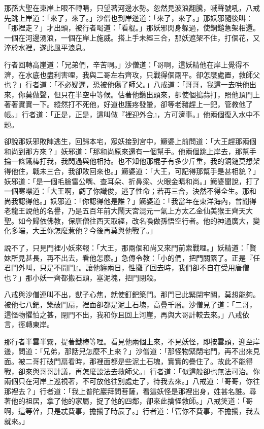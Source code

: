 那孫大聖在東岸上眼不轉睛，只望著河邊水勢。忽然見波浪翻騰，喊聲號吼，八戒先跳上岸道：「來了，來了。」沙僧也到岸邊道：「來了，來了。」那妖邪隨後叫：「那裡走？」才出頭，被行者喝道：「看棍。」那妖邪閃身躲過，使銅鎚急架相還。一個在河邊湧浪，一個在岸上施威。搭上手未經三合，那妖遮架不住，打個花，又淬於水裡，遂此風平浪息。

行者回轉高崖道：「兄弟們，辛苦啊。」沙僧道：「哥啊，這妖精他在岸上覺得不濟，在水底也盡利害哩，我與二哥左右齊攻，只戰得個兩平。卻怎麼處置，救師父也？」行者道：「不必疑遲，恐被他傷了師父。」八戒道：「哥哥，我這一去哄他出來，你莫做聲，但只在半空中等候。估著他鑽出頭來，卻使個搗蒜打，照他頂門上著著實實一下。縱然打不死他，好道也護疼發暈，卻等老豬趕上一鈀，管教他了帳。」行者道：「正是，正是，這叫做『裡迎外合』，方可濟事。」他兩個復入水中不題。

卻說那妖邪敗陣逃生，回歸本宅，眾妖接到宮中，鱖婆上前問道：「大王趕那兩個和尚到那方來？」妖邪道：「那和尚原來還有一個幫手。他兩個跳上岸去，那幫手掄一條鐵棒打我，我閃過與他相持。也不知他那棍子有多少斤重，我的銅鎚莫想架得他住，戰未三合，我卻敗回來也。」鱖婆道：「大王，可記得那幫手是甚相貌？」妖邪道：「是一個毛臉雷公嘴、查耳朵、折鼻梁、火眼金睛和尚。」鱖婆聞說，打了一個寒噤道：「大王啊，虧了你識俊，逃了性命；若再三合，決然不得全生。那和尚我認得他。」妖邪道：「你認得他是誰？」鱖婆道：「我當年在東洋海內，曾聞得老龍王說他的名譽，乃是五百年前大鬧天宮混元一氣上方太乙金仙美猴王齊天大聖。如今歸依佛教，保唐僧往西天取經，改名喚做孫悟空行者。他的神通廣大，變化多端，大王你怎麼惹他？今後再莫與他戰了。」

說不了，只見門裡小妖來報：「大王，那兩個和尚又來門前索戰哩。」妖精道：「賢妹所見甚長，再不出去，看他怎麼。」急傳令教：「小的們，把門關緊了。正是『任君門外叫，只是不開門』。讓他纏兩日，性攤了回去時，我們卻不自在受用唐僧也？」那小妖一齊都搬石頭，塞泥塊，把門閉殺。

八戒與沙僧連叫不出，獃子心焦，就使釘鈀築門。那門已此緊閉牢關，莫想能夠。被他七八鈀，築破門扇，裡面卻都是泥土石塊，高疊千層。沙僧見了道：「二哥，這怪物懼怕之甚，閉門不出，我和你且回上河崖，再與大哥計較去來。」八戒依言，徑轉東岸。

那行者半雲半霧，提著鐵棒等哩。看見他兩個上來，不見妖怪，即按雲頭，迎至岸邊，問道：「兄弟，那話兒怎麼不上來？」沙僧道：「那怪物緊閉宅門，再不出來見面。被二哥打破門扇看時，那裡面都是些泥土石塊，實實的疊住了。故此不能得戰，卻來與哥哥計議，再怎麼設法去救師父。」行者道：「似這般卻也無法可治。你兩個只在河岸上巡視著，不可放他往別處走了，待我去來。」八戒道：「哥哥，你往那裡去？」行者道：「我上普陀巖拜問菩薩，看這妖怪是那裡出身，姓甚名誰。尋著他的祖居，拿了他的家屬，捉了他的四鄰，卻來此擒怪救師。」八戒笑道：「哥啊，這等幹，只是忒費事，擔擱了時辰了。」行者道：「管你不費事，不擔擱，我去就來。」

